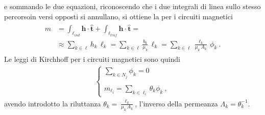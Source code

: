 \documentclass[letterpaper,10pt,italian]{jupyterBook}
\begin{document}
\sphinxAtStartPar
e sommando le due equazioni, riconoscendo che i due integrali di linea sullo stesso percorsoin versi opposti si annullano, si ottiene la  per i circuiti magnetici
\begin{equation*}
\begin{split}\begin{aligned}
  m & = \int_{\ell_{ind}} \mathbf{h} \cdot \hat{\mathbf{t}} + \int_{\ell_{traf}} \mathbf{h} \cdot \hat{\mathbf{t}} = \\
    & \approx \sum_{k \in \ell} h_k \, \ell_k 
      = \sum_{k \in \ell} \frac{b_k}{\mu_k} \, \ell_k 
      = \sum_{k \in \ell} \frac{\ell_k}{\mu_k \, A_k} \, \phi_k  \ .
\end{aligned}\end{split}
\end{equation*}
\sphinxAtStartPar
Le leggi di Kirchhoff per i circuiti magnetici sono quindi
\begin{equation*}
\begin{split}\begin{cases}
  \sum_{k \in N_j} \phi_k = 0 \\ \\
  m_{\ell_i} = \sum_{k \in \ell_i} \theta_k \phi_k \ ,
\end{cases}\end{split}
\end{equation*}
\sphinxAtStartPar
avendo introdotto la riluttanza \(\theta_k = \frac{\ell_k}{\mu_k \, A_k}\), l’inverso della permeanza \(\Lambda_k = \theta_k^{-1}\).

\sphinxstepscope
\end{document}
